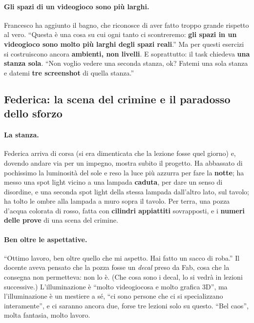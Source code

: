 \paragraph{Gli spazi di un videogioco sono più larghi.} Francesco ha aggiunto il bagno,
che riconosce di aver fatto troppo grande rispetto al vero. ``Questa è una cosa su cui
ogni tanto ci scontreremo: \textbf{gli spazi in un videogioco sono molto più larghi
degli spazi reali}.'' Ma per questi esercizi si costruiscono ancora
\textbf{ambienti, non livelli}. E soprattutto: il task chiedeva \textbf{una stanza
sola}. ``Non voglio vedere una seconda stanza, ok? Fatemi una sola stanza e datemi
\textbf{tre screenshot} di quella stanza.''

\subsection{Federica: la scena del crimine e il paradosso dello sforzo}

\paragraph{La stanza.} Federica arriva di corsa (si era dimenticata che la lezione
fosse quel giorno) e, dovendo andare via per un impegno, mostra subito il progetto. Ha
abbassato di pochissimo la luminosità del sole e reso la luce più azzurra per fare la
\textbf{notte}; ha messo una spot light vicino a una lampada \textbf{caduta}, per dare
un senso di disordine, e una seconda spot light della stessa lampada dall'altro lato,
sul tavolo; ha tolto le ombre alla lampada a muro sopra il tavolo. Per terra, una
pozza d'acqua colorata di rosso, fatta con \textbf{cilindri appiattiti} sovrapposti, e
i \textbf{numeri delle prove} di una scena del crimine.

\paragraph{Ben oltre le aspettative.} ``Ottimo lavoro, ben oltre quello che mi
aspetto. Hai fatto un sacco di roba.'' Il docente aveva pensato che la pozza fosse un
\emph{decal} preso da Fab, cosa che la consegna non permetteva: non lo è. (Che cosa
sono i decal, lo si vedrà in lezioni successive.) L'illuminazione è ``molto
videogiocosa e molto grafica 3D'', ma l'illuminazione è un mestiere a sé, ``ci sono
persone che ci si specializzano interamente'', e ci saranno ancora due, forse tre
lezioni solo su questo. ``Bel caos'', molta fantasia, molto lavoro.

